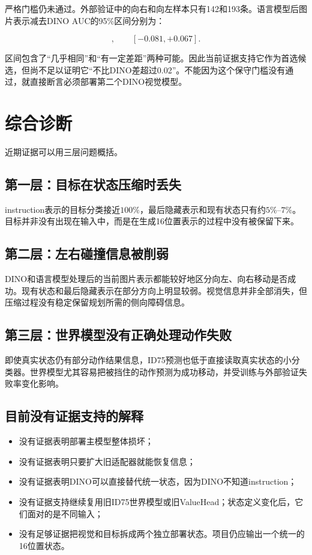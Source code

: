 \documentclass[UTF8,11pt,a4paper,fontset=none]{ctexart}
\begin{document}
严格门槛仍未通过。外部验证中的向右和向左样本只有142和193条。语言模型后图片表示减去DINO AUC的95\%区间分别为：

\begin{equation}
  [-0.081,+0.125],\qquad [-0.081,+0.067].
\end{equation}

区间包含了“几乎相同”和“有一定差距”两种可能。因此当前证据支持它作为首选候选，但尚不足以证明它“不比DINO差超过0.02”。不能因为这个保守门槛没有通过，就直接断言必须部署第二个DINO视觉模型。

\section{综合诊断}

近期证据可以用三层问题概括。

\subsection{第一层：目标在状态压缩时丢失}

instruction表示的目标分类接近$100\%$，最后隐藏表示和现有状态只有约$5\%$--$7\%$。目标并非没有出现在输入中，而是在生成16位置表示的过程中没有被保留下来。

\subsection{第二层：左右碰撞信息被削弱}

DINO和语言模型处理后的当前图片表示都能较好地区分向左、向右移动是否成功。现有状态和最后隐藏表示在部分方向上明显较弱。视觉信息并非全部消失，但压缩过程没有稳定保留规划所需的侧向障碍信息。

\subsection{第三层：世界模型没有正确处理动作失败}

即使真实状态仍有部分动作结果信息，ID75预测也低于直接读取真实状态的小分类器。世界模型尤其容易把被挡住的动作预测为成功移动，并受训练与外部验证失败率变化影响。

\subsection{目前没有证据支持的解释}

\begin{itemize}
  \item 没有证据表明部署主模型整体损坏；
  \item 没有证据表明只要扩大旧适配器就能恢复信息；
  \item 没有证据表明DINO可以直接替代统一状态，因为DINO不知道instruction；
  \item 没有证据支持继续复用旧ID75世界模型或旧ValueHead；状态定义变化后，它们面对的是不同输入；
  \item 没有足够证据把视觉和目标拆成两个独立部署状态。项目仍应输出一个统一的16位置状态。
\end{itemize}
\end{document}
